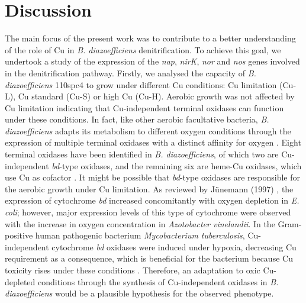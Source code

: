 \documentclass[a4paper,11pt]{article}
\begin{document}
\section{Discussion}
The main focus of the present work was to contribute to a better understanding of the
role of Cu in {\em B. diazoefficiens} denitrification. To achieve this goal, we undertook a
study of the expression of the {\em nap}, {\em nirK}, {\em nor} and {\em nos} genes involved in the denitrification pathway. Firstly, we analysed the capacity of
{\em B. diazoefficiens} 110spc4 to grow under different Cu conditions: Cu limitation (Cu-L), Cu
standard (Cu-S) or high Cu (Cu-H). Aerobic growth was not affected by Cu limitation
indicating that Cu-independent terminal oxidases can function under these conditions. In
fact, like other aerobic facultative bacteria, {\em B. diazoefficiens} adapts its metabolism to different
oxygen conditions through the expression of multiple terminal oxidases with a distinct
affinity for oxygen \cite{delgado1998genes}. Eight terminal oxidases have been identified in {\em B. diazoefficiens},
of which two are Cu-independent {\em bd}-type oxidases, and the remaining six are heme-Cu oxidases, which use Cu as cofactor \cite{buhler2010disparate}. It might be possible that {\em bd}-type oxidases
are responsible for the aerobic growth under Cu limitation. As reviewed by Jünemann
(1997) \cite{junemann1997cytochrome}, the expression of cytochrome {\em bd} increased concomitantly with oxygen depletion
in {\em E. coli}; however, major expression levels of this type of cytochrome were observed with
the increase in oxygen concentration in {\em Azotobacter vinelandii}. In the Gram-positive human
pathogenic bacterium {\em Mycobacterium tuberculosis}, Cu-independent cytochrome {\em bd} oxidases
were induced under hypoxia, decreasing Cu requirement as a consequence, which is
beneficial for the bacterium because Cu toxicity rises under these conditions \cite{marcus2016csor}. Therefore,
an adaptation to oxic Cu-depleted conditions through the synthesis of Cu-independent
oxidases in {\em B. diazoefficiens} would be a plausible hypothesis for the observed phenotype.
\end{document}
